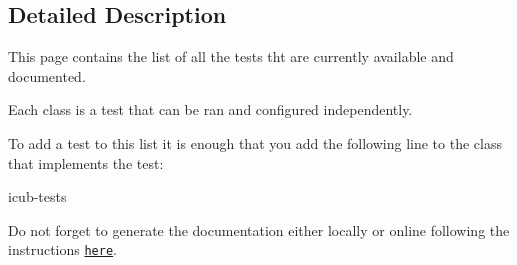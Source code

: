 \subsection{Detailed Description}
This page contains the list of all the tests tht are currently available and documented. 

Each class is a test that can be ran and configured independently.

To add a test to this list it is enough that you add the following line to the class that implements the test\+:

\begin{DoxyVerb}\ingroup icub-tests\end{DoxyVerb}


Do not forget to generate the documentation either locally or online following the instructions \href{https://github.com/robotology/icub-tests/}{\tt here}. 